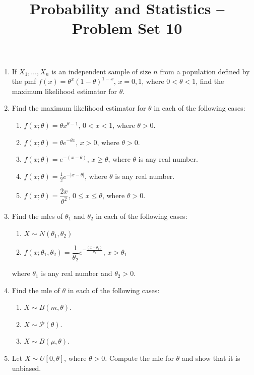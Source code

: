 \documentclass[svgnames]{amsart}
\title[]{Probability and Statistics -- Problem Set 10}
\begin{document}
\maketitle
\begin{enumerate}[leftmargin=*, itemsep=2mm]
\item If $X_1, \ldots, X_n$ is an independent sample of size $n$ from a population defined by the pmf $f(x) = \theta^x (1 - \theta)^{1 - x}$, $x = 0, 1$, where $0 < \theta < 1$, find the maximum likelihood estimator for $\theta$.

\item Find the maximum likelihood estimator for $\theta$ in each of the following cases:
\begin{enumerate}
\item $f(x; \theta) = \theta x^{\theta - 1}$, $0 < x < 1$, where $\theta > 0$.
\item $f(x; \theta) = \theta e^{-\theta x}$, $x > 0$, where $\theta > 0$.
\item $f(x; \theta) = e^{-(x - \theta)}$, $x \ge \theta$, where $\theta$ is any real number.
\item $f(x; \theta) = \frac 1 2 e^{-|x - \theta|}$, where $\theta$ is any real number.
\item $f(x; \theta) = \dfrac {2x} {\theta^2}$, $0 \le x \le \theta$, where $\theta > 0$.
\end{enumerate}

\item Find the mles of $\theta_1$ and $\theta_2$ in each of the following cases:
\begin{enumerate}
\item $X \sim N(\theta_1, \theta_2)$
\item $f(x; \theta_1, \theta_2) = \dfrac{1}{\theta_2} e^{- \frac{(x - \theta_1)}{\theta_2}}$, $x > \theta_1$
\end{enumerate}
where $\theta_1$ is any real number and $\theta_2 > 0$.

\item Find the mle of $\theta$ in each of the following cases:
\begin{enumerate}
\item  $X \sim B(m, \theta)$.
\item $X \sim \mathcal P(\theta)$.
\item $X \sim B(\mu, \theta)$.
\end{enumerate}

\item Let $X \sim U[0, \theta]$, where $\theta > 0$. Compute the mle for $\theta$ and show that it is unbiased.


\end{enumerate}
\end{document}
